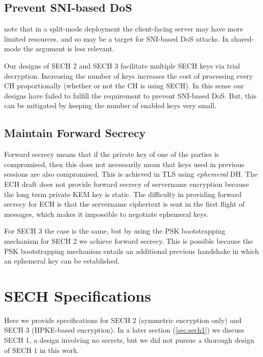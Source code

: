 \subsection{Prevent SNI-based DoS}
\cite{rfc8744-issues} note that in a split-mode deployment the client-facing server
may have more limited resources,
and so may be a target for \ac{SNI}-based \ac{DoS} attacks.
In shared-mode the argument is less relevant.

Our designs of \ac{SECH} 2 and \ac{SECH} 3
facilitate multiple \ac{SECH} keys
via trial decryption.
Increasing the number of keys increases
the cost of processing every \ac{CH} proportionally (whether or not the \ac{CH} is using \ac{SECH}).
In this sense our designs have failed to
fulfill the requirement to prevent
\ac{SNI}-based \ac{DoS}.
But, this can be mitigated by keeping
the number of enabled keys very small.

\subsection{Maintain Forward Secrecy}
Forward secrecy means that if the private key of one of the parties is compromised, then this
does not necessarily mean that
keys used in previous sessions are also compromised.
This is achieved in \ac{TLS} using {\em ephemeral} \ac{DH}.
The \ac{ECH} draft does not provide
forward secrecy of servername encryption because the long term private \ac{KEM} key is static.
The difficulty in providing forward secrecy
for \ac{ECH} is that the
servername ciphertext is sent in
the first flight of messages,
which makes it impossible to
negotiate ephemeral keys.

For \ac{SECH} 3 the case is the same,
but by using the \ac{PSK} bootstrapping
mechanism for \ac{SECH} 2 we achieve
forward secrecy.
This is possible because the \ac{PSK}
bootstrapping mechanism entails an additional previous handshake in which
an ephemeral key can be established.

\section{SECH Specifications}
Here we provide specifications for \ac{SECH} 2 (symmetric encryption only) and \ac{SECH} 3 (\ac{HPKE}-based encryption).
In a later section (\ref{sec:sech1}) we discuss \ac{SECH} 1, a design involving no secrets,
but we did not pursue a thorough design of \ac{SECH} 1 in this work.



